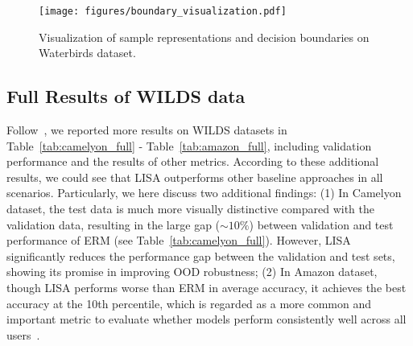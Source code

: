 \begin{figure}[h]
\centering
  \texttt{[image: figures/boundary\_visualization.pdf]}
  \vspace{-0.5em}
  \caption{Visualization of sample representations and decision boundaries on Waterbirds dataset.}\label{fig:boundary}
\end{figure}

\subsection{Full Results of WILDS data}
\label{sec:app_domain_full_results}
Follow~\citet{koh2021wilds}, we reported more results on WILDS datasets in Table~\ref{tab:camelyon_full} - Table~\ref{tab:amazon_full}, including validation performance and the results of other metrics. According to these additional results, we could see that LISA outperforms other baseline approaches in all scenarios. Particularly, we here discuss two additional findings: (1) In Camelyon dataset, the test data is much more visually distinctive compared with the validation data, resulting in the large gap ($\sim10\%$) between validation and test performance of ERM (see Table~\ref{tab:camelyon_full}). However, LISA significantly reduces the performance gap between the validation and test sets, showing its promise in improving OOD robustness; (2) In Amazon dataset, though LISA performs worse than ERM in average accuracy, it achieves the best accuracy at the 10th percentile, which is regarded as a more common and important metric to evaluate whether models perform consistently well across all users~\citep{koh2021wilds}.


